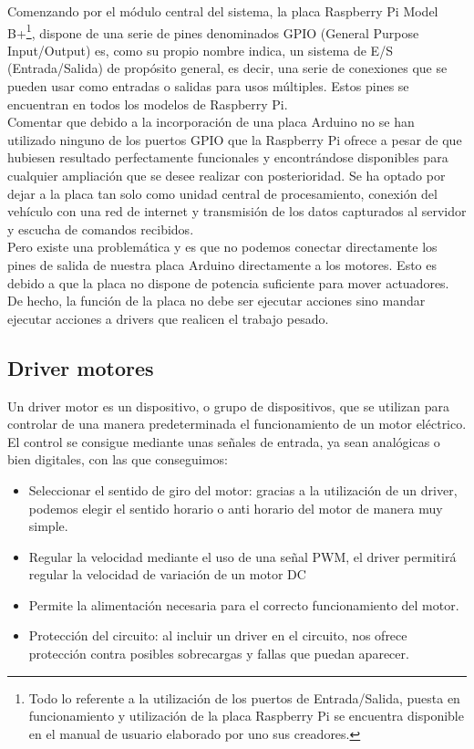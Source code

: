 Comenzando por el módulo central del sistema, la placa Raspberry Pi Model B+\footnote{ Todo lo referente a la utilización de los puertos de Entrada/Salida, puesta en funcionamiento y
utilización de la placa Raspberry Pi se encuentra disponible en el manual de usuario \cite{book:Raspberry} elaborado por uno sus creadores. }, dispone de una serie de pines denominados GPIO (General Purpose Input/Output) es, como su propio nombre indica, 
un sistema de E/S (Entrada/Salida) de propósito general, es decir, una serie de conexiones que se pueden usar como entradas o salidas para usos múltiples. Estos pines se encuentran en todos
los modelos de Raspberry Pi.\\

Comentar que debido a la incorporación de una placa Arduino no se han utilizado ninguno de los puertos GPIO que la Raspberry Pi ofrece a pesar de que hubiesen resultado perfectamente 
funcionales y encontrándose disponibles para cualquier ampliación que se desee realizar con posterioridad. Se ha optado por dejar a la placa tan solo como unidad central de 
procesamiento, conexión del vehículo con una red de internet y transmisión de los datos capturados al servidor y escucha de comandos recibidos.\\

Pero existe una problemática y es que no podemos conectar directamente los pines de salida de nuestra placa Arduino directamente a los motores. Esto es debido a
que la placa no dispone de potencia suficiente para mover actuadores. De hecho, la función de la placa no debe ser ejecutar acciones sino mandar ejecutar acciones a drivers que
realicen el trabajo pesado.\\

\subsection{Driver motores}

Un driver motor es un dispositivo, o grupo de dispositivos, que se utilizan para controlar de una manera predeterminada el funcionamiento de un motor eléctrico. El control 
se consigue mediante unas señales de entrada, ya sean analógicas o bien digitales, con las que 
conseguimos:

\begin{itemize}
 \item Seleccionar el sentido de giro del motor: gracias a la utilización de un driver, podemos 
elegir el sentido horario o anti horario del motor de manera muy simple.
\item Regular la velocidad mediante el uso de una señal PWM, el driver permitirá regular la velocidad de variación de un motor DC
\item Permite la alimentación necesaria para el correcto funcionamiento del motor.
\item Protección del circuito: al incluir un driver en el circuito, nos ofrece protección contra 
posibles sobrecargas y fallas que puedan aparecer.
\end{itemize}

